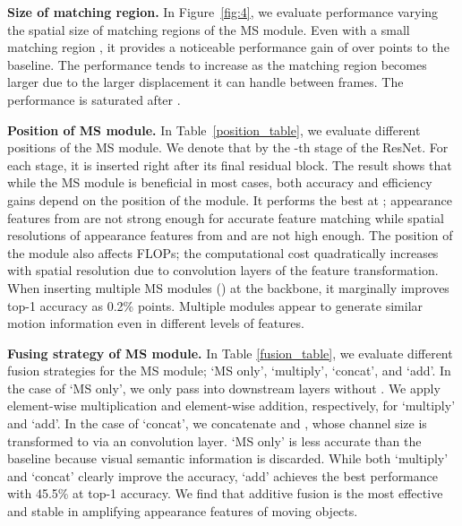 \documentclass[runningheads]{llncs}
\begin{document}
\noindent
\textbf{Size of matching region.}
In Figure~\ref{fig:4}, we evaluate performance varying the spatial size of matching regions of the MS module.
Even with a small matching region , it provides a noticeable performance gain of over  points to the baseline.
The performance tends to increase as the matching region becomes larger due to the larger displacement it can handle between frames.
The performance is saturated after . 

\smallbreak
\noindent \textbf{Position of MS module.}
In Table~\ref{position_table}, we evaluate different positions of the MS module.
We denote that  by the -th stage of the ResNet.
For each stage, it is inserted right after its final residual block. 
The result shows that while the MS module is beneficial in most cases, both accuracy and efficiency gains depend on the position of the module.
It performs the best at ; appearance features from  are not strong enough for accurate feature matching while spatial resolutions of appearance features from  and  are not high enough.
The position of the module also affects FLOPs; the computational cost quadratically increases with spatial resolution due to convolution layers of the feature transformation.
When inserting multiple MS modules () at the backbone, it marginally improves top-1 accuracy as 0.2\% points.
Multiple modules appear to generate similar motion information even in different levels of features.


\smallbreak
\noindent \textbf{Fusing strategy of MS module.}
In Table \ref{fusion_table}, we evaluate different fusion strategies for the MS module; `MS only', `multiply', `concat', and `add'.
In the case of `MS only', we only pass  into downstream layers without .
We apply element-wise multiplication and element-wise addition, respectively, for `multiply' and `add'.
In the case of `concat', we concatenate  and , whose channel size is transformed to  via an  convolution layer.
`MS only' is less accurate than the baseline because visual semantic information is discarded.
While both `multiply' and `concat' clearly improve the accuracy, `add' achieves the best performance with 45.5\% at top-1 accuracy. 
We find that additive fusion is the most effective and stable in amplifying appearance features of moving objects. 
\end{document}
